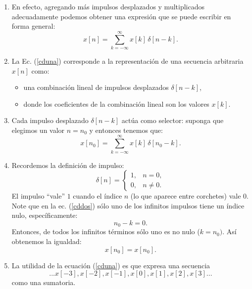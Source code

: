\begin{enumerate}
	\item En efecto, agregando más impulsos desplazados y
	multiplicados adecuadamente podemos obtener una expresión que se
	puede escribir en forma general:
	\begin{equation}
		x[n] = \sum_{k=-\infty}^{\infty} x[k] \, \delta[n-k] .
		\label{cduna}
	\end{equation}
	
	\item La Ec. (\ref{cduna}) corresponde a la representación de una
	secuencia arbitraria $x[n]$ como:
	\begin{itemize}
		\item una combinación lineal de impulsos desplazados $\delta[n-k]$,
		\item donde los coeficientes de la combinación lineal son los valores $x[k]$.
	\end{itemize}
	
	\item Cada impulso desplazado $\delta[n-k]$ actúa
	como selector: suponga que elegimos un valor $n=n_{0}$ y entonces
	tenemos que:
	\begin{equation}
		x[n_{0}] = \sum_{k=-\infty}^{\infty} x[k] \, \delta[n_{0}-k] .
		\label{cddos}
	\end{equation}
	
	\item Recordemos la definición de impulso:
	\begin{equation}
		\delta[n] = 
		\begin{cases}
			1, & n = 0, \\ 
			0, & n \neq 0.
		\end{cases}
	\end{equation}
	El impulso ``vale'' $1$ cuando el índice $n$ (lo que aparece
	entre corchetes) vale $0$. Note que en la ec. (\ref{cddos}) sólo
	uno de los infinitos impulsos tiene un índice nulo,
	específicamente:
	\begin{equation}
		n_{0}-k=0.
	\end{equation}
	Entonces, de todos los infinitos términos sólo uno es no
	nulo ($k=n_{0})$. Así obtenemos la igualdad:
	\begin{equation}
		x[n_{0}] = x[n_{0}] .
	\end{equation}
	
	\item La utilidad de la ecuación (\ref{cduna}) es que expresa una secuencia
	\begin{equation}
		...x[-3], x[-2], x[-1], x[0], x[1], x[2], x[3]...
	\end{equation}
	como una sumatoria.
\end{enumerate}

